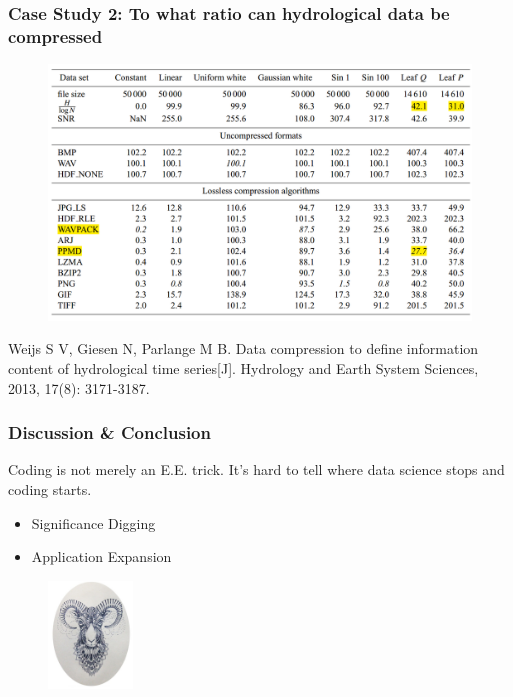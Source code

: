 \documentclass{beamer}
\begin{document}
\begin{CJK}{UTF8}{gkai}
\begin{frame}
\frametitle{Case Study 2: To what ratio can hydrological data be compressed}
\begin{figure}[H]\centering
\includegraphics[width=.78\textwidth]{compress.png}
\end{figure}
\tiny{Weijs S V, Giesen N, Parlange M B. Data compression to define information content of hydrological time series[J]. Hydrology and Earth System Sciences, 2013, 17(8): 3171-3187.} 
\end{frame} 
\begin{frame}
\frametitle{Discussion \& Conclusion}
  Coding is not merely an E.E. trick. It's hard to tell where data science stops and coding starts.
\begin{itemize}
\item Significance Digging
\item Application Expansion
\end{itemize}
\end{frame}

\begin{frame}
\begin{figure}[H]\centering
\includegraphics[width=0.2\textwidth]{goat.jpg}
\end{figure}
\end{frame} 

\end{CJK}
\end{document}
